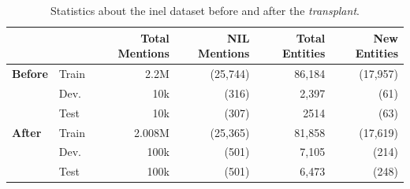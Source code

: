 \begin{table}[htbp]
    \centering
    \caption{Statistics about the \acs{inel} dataset before and after the \textit{transplant}.}
    \label{tab:dataset_nils}
    \begin{tabular}{ll|rr|rr}
    \toprule
    && \textbf{Total Mentions} & \textbf{NIL Mentions} & \textbf{Total Entities} & \textbf{New Entities} \\
    \midrule
        \textbf{Before} &Train & 2.2M & (25,744)  & 86,184 & (17,957) \\
        &Dev.   & 10k  & (316)    & 2,397  & (61) \\
        &Test  & 10k  &(307)     & 2514  & (63) \\
        \toprule
       \textbf{After}&Train & 2.008M & (25,365)  & 81,858 & (17,619) \\
       &Dev.   & 100k   & (501)     & 7,105 & (214) \\
       &Test  & 100k   & (501)     & 6,473 & (248) \\
    \end{tabular}
\end{table}
\vspace{-20pt}

